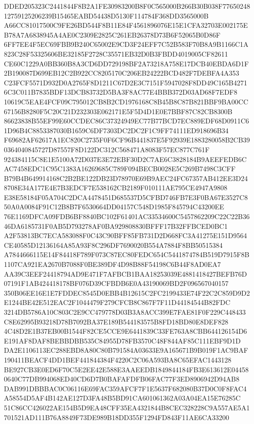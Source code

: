 \documentclass[UTF8,fontset=fandol,zihao=-4,a4paper]{ctexart}
\begin{document}
{{DDED205323C2441844F8B2A1FE30983200B8F0C565000B266B30B038F7765024812759125206239B15465EABD54438D5130F114784F368DD3565000B
A66CC81017500C9FE26BD544F8B11E84F4561896076E15E1CFA32703E002175EB78A7A6838945A4AE0C2309E2825C261EB26378D73B6F52065B0D86F
6FF7EE4F5EC69FBB9B240C65002E9CD3F24EFF7C52B583F70B8A9B1166C1A823C28F53325606BE32185F2728C35571EB32D0B3FBDD4019005CF82611
CE60C1229A0BB360B8A3CD6DD729198BF2A73218A758E17DCB40EBDA6D1F2B190087D699EB12C2B922CC8205170C206EB24222BCD482F7DEBFA4A353
C23FCF5571D932D0A2765F8D1211C67D2E3C7151F5947028F8DD49C165B42716C3C011B7835BDF13DCB83732D5BA3F8AC77E4BBB372D03AD68F7EDF8
10619C5EAE4FCF09C795012CB8B2CD1976168C8B45B8C87B821BBF9BA00CC67156B8280F5C20C21D232303E062171E5F5D4D1E0E7BBF87C82CB8300B
86623838B55EF99E60CCDEC86C37324949EC77B77BCD7EC889EDF68D0911C61D96B4C8853387030B1659C6DF7303DC2DC2F1C9FF74111ED918696B34
F69682AF62617A1EC820C2735F0F6CF96B441837E5F92939E1883280058B2CB390364040845727D87557F8D122DC312C568471A8083F57EC877C761F
924384115C8E1E5100A72D037E3E72EBF30D2C7AE6C3828184B9AEEFEDB6CAC7458EDC1C95C1383A16269685C789F094BECB0028E5C269B7498C3CFF
B79B4B649914168C2B2BE122DB23D78970E69B9AEC24FC67357AB412EE3D248708E34A177E4E7B3EDCF7E538162CB2189F010111AE795CE4947A9808
E38E58184F05A704C2DCA4478451D685537D5CFBD746FB7E3F0BA67E3527C850A0A0084F91C12B8B7F6530664DD04157C548D1985F845794C43200EE
76E1169DFCA09FDB6BF8840BC102F61401AC33534600C5457862209C22C22B3646DA6185731F0AB5D793278AF0BA929808830BFFF17B32FFBCED0BC1
A2F53813BC7ECA583088F0C43C90BFF85FB731D2D668FC3A41275E151D9564CE40585D12136164A85A93F8C296DF7690020B554A7884F8BB50515384
A7844666115E14F84418F789F073C87EC80FEDC654C5441874784B519D7915F8B1107CA921EA2670B7088F0BE389DF4D98B88F54198C6B44F8AD0EA7
AA39C3EEF24418794AD9E471F7AFBCB1BAA18253039E4881418427BEFB76D07191F1AB424418178BF076D39CFBDB6E0A43190069BD2F096567040157
350B06EE16E1E7FDDEC8545D0EBB4B12615C2FC2199433E74F22C2C859D9D2E1244BE42E512EAC2F1044479F279CFCB8C867F7F11D44184544B82FDC
3214DB5786A10C803C2E9CC479778D03B3A8ACC399E7FAE81F0F229C448433C8E62995B93218D78B7092BA37E189B544183575B8FD18BD80E8DEF828
4C48D2E1B37EB00B1544F82CE5CCE9E6441839C33FE763A8CBB644126154D6E191AF8DAF8BEBBDBB535C84955D78FB3570C48F844AF85C111EBF9D1D
DA2E1106113EC288EBD8A80C80B791584A03633E9A165671B9B019F1AC9BAF190411BEACF4DD1BEF441844384F4220C2C06A593BA8C65EFAC1443128
BE927CB3E0ED6F70C5E2EE42E588E3AAEEDB1849844184FB3E613612E044580640C77DB994068ED40CD6D7B0BAFAFDFB06FAC77F3ED8906942D94AB8
DAB991DBBBAC0C06116E69FAC359AFCF7F1E5637F682080B37D0C0F8FAC4A58554D5AF4B142AE127D3FA48B5BD91CA601061362A03A04EA15E76285C
51C86CC426022AE154B5D9EA48CFF35EA4321844B8CEC328228C9A557AE5A1701521AD111B76A8849F73DE989B18DD355F1294FD843F11AE6CA33200
}}
\end{document}
